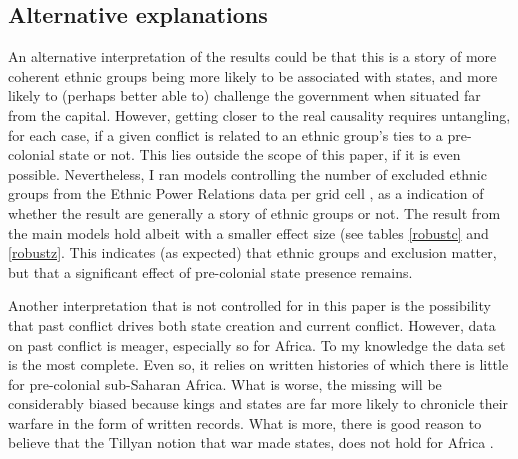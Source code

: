\documentclass[12pt]{article}
\begin{document}


\subsection{Alternative explanations} \label{Alternative explanations}

An alternative interpretation of the results could be that this is a story of
more coherent ethnic groups being more likely to be associated with states, and
more likely to (perhaps better able to) challenge the government when situated
far from the capital. However, getting closer to the real causality requires
untangling, for each case, if a given conflict is related to an ethnic group's
ties to a pre-colonial state or not. This lies outside the scope of this paper,
if it is even possible. Nevertheless, I ran models controlling the number of
excluded ethnic groups from the Ethnic Power Relations data per grid cell
\citep{Vogt2015}, as a indication of whether the result are generally a story of
ethnic groups or not. The result from the main models hold albeit with a smaller
effect size (see tables \ref{robustc} and \ref{robustz}. This indicates (as
expected) that ethnic groups and exclusion matter, but that a significant effect
of pre-colonial state presence remains.

Another interpretation that is not controlled for in this paper is the
possibility that past conflict drives both state creation and current conflict.
However, data on past conflict is meager, especially so for Africa. To my
knowledge the \citet{Brecke1999} data set is the most complete. Even so, it
relies on written histories of which there is little for pre-colonial
sub-Saharan Africa. What is worse, the missing will be considerably biased
because kings and states are far more likely to chronicle their warfare in the
form of written records. What is more, there is good reason to believe that the
Tillyan notion that war made states, does not hold for Africa
\citep{Dincecco_2019}. 
\end{document}
